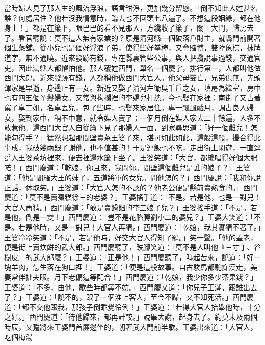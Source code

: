 \begin{showcontents}{}
當時婦人見了那人生的風流浮浪，語言甜淨，更加幾分留戀。「倒不知此人姓甚名誰？何處居住？他若沒我情意時，臨去也不回頭七八遍了。不想這段姻緣，都在他身上！」都是在簾下，眼巴巴的看不見那人，方纔收了簾子，關上大門，歸房去了。看官聽說：莫不這人無有家業的？原是清河縣一個破落戶財主，就縣門前開著個生藥舖。從小兒也是個好浮浪子弟，使得些好拳棒，又會賭博，雙陸象棋，抹牌道字，無不通曉。近來發跡有錢，專在縣裏管些公事，與人把攬說事過錢，交通官吏，因此滿縣人都懼怕他。那人覆姓西門，單名一個慶字，排行第一，人都叫他做西門大郎。近來發跡有錢，人都稱他做西門大官人。他父母雙亡，兄弟俱無，先頭渾家是早逝，身邊止有一女。新近又娶了清河左衛吳千戶之女，填房為繼室，房中也有四五個丫鬟婦女。又常與抅攔裡的李嬌兒打熱。今也娶在家裡；南街子又占著窠子卓二姐，名卓丟兒，包了些時，也娶來家居住。專一飄風戲月，調占良人婦女，娶到家中，稍不中意，就令媒人賣了；一個月倒在媒人家去二十餘遍，人多不敢惹他。這西門大官人自從簾下見了那婦人一面，到家尋思道：「好一個雌兒！怎能勾得手？」猛然想起那間壁賣茶王婆子來，堪可如此如此，這般這般，撮合得此事成，我破幾兩銀子謝他，也不值甚的！于是連飯也不吃，走出街上閑遊，一直逕踅入王婆茶坊裡來，便去裡邊水簾下坐了。王婆笑道：「大官，都纔唱得好個大肥喏！」西門慶道：「乾娘，你且來，我問你。間壁這個雌兒是誰的娘子？」王婆道：「他是閻羅大王的妹子，五道將軍的女兒。問他怎的？」西門慶說：「我和你說正話，休取笑。」王婆道：「大官人怎的不認的？他老公便是縣前賣熟食的。」西門慶道：「莫不是賣棗糕徐三的老婆？」王婆搖手道：「不是。若是他，也是一對兒！大官人再猜。」西門慶道：「敢是賣餶飿的李三娘子兒？」王婆搖手道：「不是。若是他，倒是一雙！」西門慶道：「豈不是花胳膊劉小二的婆兒？」王婆大笑道：「不是。若是他時，又是一對兒！大官人再猜。」西門慶道：「乾娘，我其實猜不著了。」王婆冷冷笑道：「不是，若是他時，好交大官人得知了罷。」笑一聲。「他的蓋老，便是街上賣炊餅的武大郎。」西門慶聽了，跌腳笑道：「莫不是人叫他『三寸丁、谷樹皮』的武大郎麼？」王婆道：「正是他！」西門慶聽了，叫起苦來，說道：「好一塊羊肉，怎生落在狗口裡！」王婆道：「便是這般故事。自古駿馬都駝痴漢走，美妻常伴拙夫眼。月下老偏這等配合！」西門慶道：「乾娘，我少你多少茶果錢？」王婆道：「不多，由他，歇些時都筭不妨。」西門慶又道：「你兒子王潮，跟誰出去了？」王婆道：「說不的，跟了一個淮上客人，至今不歸，又不知死活。」西門慶道：「都不交他跟我，那孩子倒乖覺伶俐！」王婆道：「若得大官人抬舉他時，十分之好。」西門慶道：「待他歸來，都再計較。」說畢大謝，起身去了。約莫未及兩個時辰，又踅將來王婆門首簾邊坐的，朝著武大門前半歇。王婆出來道：「大官人，吃個梅湯 
\end{showcontents}
